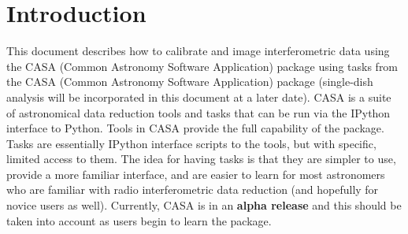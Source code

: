 
\newcommand{\toolmanager}{{\tt Tool Manager}}
\newcommand{\ms}{{\tt ms}}
\newcommand{\autoflag}{{\tt autoflag}}
\newcommand{\flagger}{{\tt flagger}}
\newcommand{\msplot}{{\tt msplot}}
\newcommand{\calibrater}{{\tt calibrater}}
\newcommand{\imager}{{\tt imager}}
\newcommand{\image}{{\tt image}}
\newcommand{\viewer}{{\tt viewer}}
\newcommand{\catalog}{{\tt catalog}}
\newcommand{\tablebrowser}{{\tt tablebrowser}}
\newcommand{\VdisplaypanelTs}{{\tt Viewer Display Panels}}
\newcommand{\VdisplaypanelT}{{\tt Viewer Display Panel}}
\newcommand{\guilong}{graphical user interface}
\newcommand{\guishort}{GUI}
\newcommand{\ssf}{{\it}}
\newcommand{\sff}{{\it}}
\newcommand{\gcf}{{\it}}
\newcommand{\stf}{{\it}}
\newcommand{\fits}{FITS}
\newcommand{\imagefile}{imagefile}
\newcommand{\toolfunction}{toolfunction}
\newcommand{\toolfunctions}{toolfunction}

\newcommand{\almatifiller}{{\tt almatifiller}}
\newcommand{\iramcalibrater}{{\tt iramcalibrater}}



\chapter{Introduction}
\label{chapter:Intro}


\vspace{5mm}
This document describes how to calibrate and image interferometric
data using the CASA (Common Astronomy Software Application) package
using tasks from the CASA (Common Astronomy Software Application)
package (single-dish analysis will be incorporated in this document at
a later date).  CASA is a suite of astronomical data reduction tools
and tasks that can be run via the IPython interface to Python. Tools
in CASA provide the full capability of the package.  Tasks are
essentially IPython interface scripts to the tools, but with specific,
limited access to them.  The idea for having tasks is that they are
simpler to use, provide a more familiar interface, and are easier to
learn for most astronomers who are familiar with radio interferometric
data reduction (and hopefully for novice users as well).  Currently,
CASA is in an {\bf alpha release} and this should be taken into account
as users begin to learn the package.


